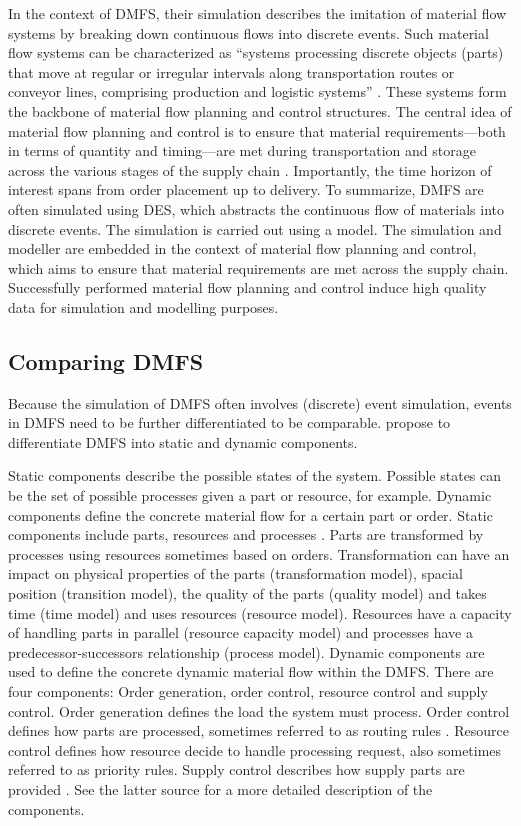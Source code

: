 In the context of DMFS, their simulation describes the imitation of material flow systems by breaking down continuous flows into discrete events. Such material flow systems can be characterized as “systems processing discrete objects (parts) that move at regular or irregular intervals along transportation routes or conveyor lines, comprising production and logistic systems” \parencite{Arnold2006,schwede2024learning}. These systems form the backbone of material flow planning and control structures. The central idea of material flow planning and control is to ensure that material requirements—both in terms of quantity and timing—are met during transportation and storage across the various stages of the supply chain \autocite{Gehr2007}. Importantly, the time horizon of interest spans from order placement up to delivery.
To summarize, DMFS are often simulated using DES, which abstracts the continuous flow of materials into discrete events. The simulation is carried out using a model. The simulation and modeller are embedded in the context of material flow planning and control, which aims to ensure that material requirements are met across the supply chain. Successfully performed material flow planning and control induce high quality data for simulation and modelling purposes.

\subsection{Comparing DMFS}
Because the simulation of DMFS often involves (discrete) event simulation, events in DMFS need to be further differentiated to be comparable. \Autocite{Arnold2006} propose to differentiate DMFS into static and dynamic components.

Static components describe the possible states of the system. Possible states can be the set of possible processes given a part or resource, for example. Dynamic components define the concrete material flow for a certain part or order.
Static components include parts, resources and processes \autocite{schwede2024learning}. Parts are transformed by processes using resources sometimes based on orders. Transformation can have an impact on physical properties of the parts (transformation model), spacial position (transition model), the quality of the parts (quality model) and takes time (time model) and uses resources (resource model). Resources have a capacity of handling parts in parallel (resource capacity model) and processes have a predecessor-successors relationship (process model).
Dynamic components are used to define the concrete dynamic material flow within the DMFS. There are four components: Order generation, order control, resource control and supply control. Order generation defines the load the system must process. Order control defines how parts are processed, sometimes referred to as routing rules \autocite{mildeautomated}. Resource control defines how resource decide to handle processing request, also sometimes referred to as priority rules. Supply control describes how supply parts are provided \autocite{mildeautomated,schwede2024learning}. See the latter source for a more detailed description of the components.


